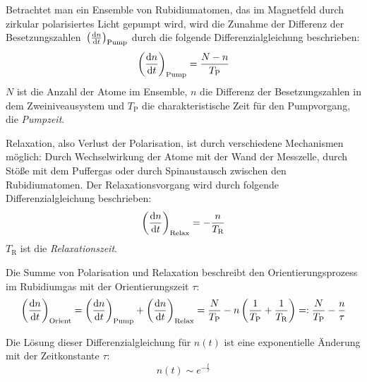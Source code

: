 Betrachtet man ein Ensemble von Rubidiumatomen, das im Magnetfeld durch zirkular polarisiertes Licht gepumpt wird,
wird die Zunahme der Differenz der Besetzungszahlen~$\left(\frac{\mathrm{d} n}{\mathrm{d} t}\right)_{\text{Pump}}$
durch die folgende Differenzialgleichung beschrieben:
\begin{equation}
  \left(\frac{\mathrm{d} n}{\mathrm{d} t}\right)_{\text{Pump}}=\frac{N-n}{T_\text{P}}
\end{equation}
$N$ ist die Anzahl der Atome im Ensemble, $n$ die Differenz der Besetzungszahlen in dem Zweiniveausystem
und $T_\text{P}$ die charakteristische Zeit für den Pumpvorgang, die \emph{Pumpzeit}.

Relaxation, also Verlust der Polarisation, ist durch verschiedene Mechanismen möglich:
Durch Wechselwirkung der Atome mit der Wand der Messzelle, durch Stöße mit dem Puffergas
oder durch Spinaustausch zwischen den Rubidiumatomen.
Der Relaxationsvorgang wird durch folgende Differenzialgleichung beschrieben:
\begin{equation}
  \left(\frac{\mathrm{d} n}{\mathrm{d} t}\right)_{\text{Relax}}=-\frac{n}{T_\text{R}}
\end{equation}
$T_\text{R}$ ist die \emph{Relaxationszeit}.

Die Summe von Polarisation und Relaxation beschreibt den Orientierungsprozess im Rubidiumgas mit
der Orientierungszeit $\tau$:
\begin{equation}
\label{eq:orientierungszeit}
  \left(\frac{\mathrm{d} n}{\mathrm{d} t}\right)_{\text{Orient}}
  =\left(\frac{\mathrm{d} n}{\mathrm{d} t}\right)_{\text{Pump}} + \left(\frac{\mathrm{d} n}{\mathrm{d} t}\right)_{\text{Relax}}
  =\frac{N}{T_\text{P}}-n \left( \frac{1}{T_\text{P}} + \frac{1}{T_\text{R}}\right)
  =:\frac{N}{T_\text{P}}- \frac{n}{\tau}
\end{equation}

Die Lösung dieser Differenzialgleichung für $n(t)$ ist eine exponentielle Änderung mit der Zeitkonstante $\tau$:
\begin{equation}
\label{eq:expabhorient}
   n(t) \sim e^{-\frac{t}{\tau}}
\end{equation}


